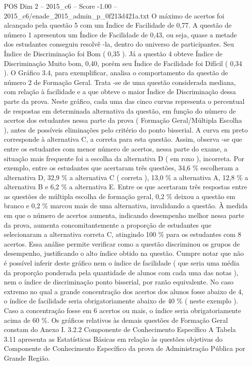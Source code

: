 \begin{textsample}{POS Dim 2 – 2015\_c6 – Score -1.00 – 2015\_c6/enade\_2015\_admin\_p\_0f213d421a.txt}
O máximo de acertos foi alcançado pela questão 5 com um Índice de Facilidade de 0,77.
A questão de número 1 apresentou um Índice de Facilidade de 0,43, ou seja, quase a metade dos estudantes conseguiu resolvê -la, dentro do universo de participantes.
Seu Índice de Discriminação foi Bom ( 0,35 ).
Já a questão 4 obteve Índice de Discriminação Muito bom, 0,40, porém seu Índice de Facilidade foi Difícil ( 0,34 ).
O Gráfico 3.4, para exemplificar, analisa o comportamento da questão de número 2 de Formação Geral.
Trata -se de uma questão considerada mediana, com relação à facilidade e a que obteve o maior Índice de Discriminação dessa parte da prova.
Neste gráfico, cada uma das cinco curvas representa o percentual de respostas em determinada alternativa da questão, em função do número de acertos dos estudantes nessa parte da prova ( Formação Geral/Múltipla Escolha ), antes de possíveis eliminações pelo critério do ponto bisserial.
A curva em preto corresponde à alternativa C, a correta para esta questão.
Assim, observa -se que entre os estudantes com menor número de acertos, nessa parte do exame, a situação mais frequente foi a escolha da alternativa D ( em roxo ), incorreta.
Por exemplo, entre os estudantes que acertaram três questões, 34,6 \% escolheram a alternativa D, 32,9 \% a alternativa C ( correta ), 13,0 \% a alternativa A, 12,8 \% a alternativa B e 6,2 \% a alternativa E.
Entre os que acertaram três respostas entre as questões de múltipla escolha de formação geral, 0,2 \% deixou a questão em branco e 0,2 \% marcou mais de uma alternativa, invalidando a questão.
À medida em que o número de acertos aumenta, indicando desempenho melhor nessa parte da prova, aumenta concomitantemente a proporção de estudantes que selecionaram a alternativa correta C, atingindo 100 \% para os estudantes com 8 acertos.
Essa análise permite verificar como a questão discriminou os grupos de desempenho, justificando o alto índice obtido na questão.
Cumpre notar que não é possível inferir deste gráfico nem o índice de facilidade ( que seria uma média da proporção ponderada pela quantidade de alunos com cada uma das notas ), nem o índice de discriminação ponto bisserial, por razão equivalente.
No caso extremo no qual a grande concentração dos acertos dos alunos fosse abaixo de 4, o índice de facilidade seria obrigatoriamente abaixo de 40 \% ( neste exemplo ).
Caso a concentração fosse em 6 acertos ou mais, o índice seria obrigatoriamente acima de 60 \%.
Os gráficos relativos às demais questões de Formação Geral constam do Anexo I. 3.2.2 Componente de Conhecimento Específico A Tabela 3.11 apresenta as Estatísticas Básicas em relação às questões objetivas do Componente de Conhecimento Específico da prova de Administração Pública por Grande Região.

\end{textsample}

